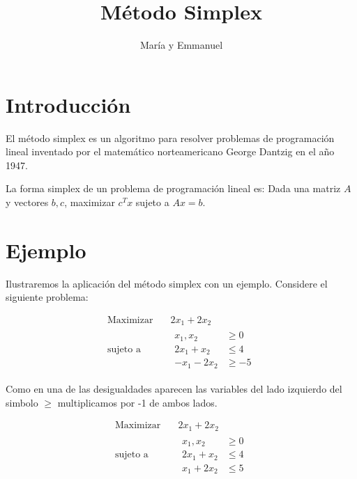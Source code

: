 \documentclass{article}
\title{Método Simplex}
\author{María y Emmanuel}
\begin{document}
\maketitle

\section{Introducción}
\label{sec:introduccion}

El método simplex es un algoritmo para resolver problemas de
programación lineal inventado por el matemático norteamericano George
Dantzig en el año 1947.

La forma simplex de un problema de programación lineal es:
Dada una matriz $A$ y vectores $b,c$, maximizar $c^Tx$ sujeto a
$Ax= b$.

\section{Ejemplo}
\label{sec:ejemplo}
Ilustraremos la aplicación del método simplex con un ejemplo.
Considere el siguiente problema:

   \begin{equation*}
   \begin{aligned}
   \text{Maximizar} \quad & 2x_{1}+2x_{2}\\
   \text{sujeto a} \quad &
     \begin{aligned}
      x_{1},x_{2} &\geq  0\\
      2x_{1}+x_{2} &\leq 4\\
      -x_{1}-2x_{2} &\geq -5
     \end{aligned}
   \end{aligned}
 \end{equation*}

 Como en una de las desigualdades aparecen las variables del lado
 izquierdo del simbolo $\geq $ multiplicamos por -1 de ambos lados.

  \begin{equation*}
   \begin{aligned}
   \text{Maximizar} \quad & 2x_{1}+2x_{2}\\
   \text{sujeto a} \quad &
     \begin{aligned}
      x_{1},x_{2} &\geq  0\\
      2x_{1}+x_{2} &\leq 4\\
      x_{1}+2x_{2} &\leq 5
     \end{aligned}
   \end{aligned}
 \end{equation*}
\end{document}
